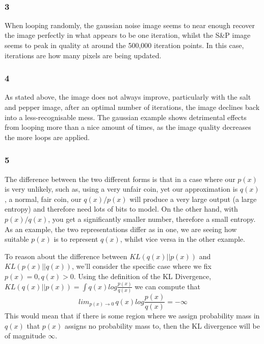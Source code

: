 \documentclass[11pt]{article}
\begin{document}
    \begin{center}
    \end{center}
    { \hspace*{\fill} \\}
    
    \subsubsection{3}\label{section}

When looping randomly, the gaussian noise image seems to near enough
recover the image perfectly in what appears to be one iteration, whilst
the S\&P image seems to peak in quality at around the 500,000 iteration
points. In this case, iterations are how many pixels are being updated.

\subsubsection{4}\label{section-1}

As stated above, the image does not always improve, particularly with
the salt and pepper image, after an optimal number of iterations, the
image declines back into a less-recognisable mess. The gaussian example
shows detrimental effects from looping more than a nice amount of times,
as the image quality decreases the more loops are applied.

\subsubsection{5}\label{section-2}

The difference between the two different forms is that in a case where
our \(p(x)\) is very unlikely, such as, using a very unfair coin, yet
our approximation is \(q(x)\), a normal, fair coin, our \(q(x)/p(x)\)
will produce a very large output (a large entropy) and therefore need
lots of bits to model. On the other hand, with \(p(x)/q(x)\), you get a
significantly smaller number, therefore a small entropy. As an example,
the two representations differ as in one, we are seeing how suitable
\(p(x)\) is to represent \(q(x)\), whilst vice versa in the other
example.

To reason about the difference between \(KL(q(x)||p(x))\) and
\(KL(p(x)||q(x))\), we'll consider the specific case where we fix
\(p(x) = 0, q(x) > 0\). Using the definition of the KL Divergence,
\(KL(q(x)||p(x)) = \int q(x) log\frac{p(x)}{q(x)}\) we can compute that
\[lim_{p(x)\rightarrow 0}\, q(x) log \frac{p(x)}{q(x)} = -\infty\] This
would mean that if there is some region where we assign probability mass
in \(q(x)\) that \(p(x)\) assigns no probability mass to, then the KL
divergence will be of magnitude \(\infty\).
\end{document}
